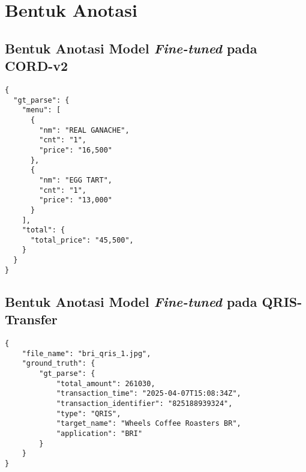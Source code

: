\chapter{Bentuk Anotasi}
\label{chap:bentuk-anotasi}

\section{Bentuk Anotasi Model \donut{} \emph{Fine-tuned} pada \datasetfl{} CORD-v2}
\begin{lstlisting}[style=jsonstyle]
{
  "gt_parse": {
    "menu": [
      {
        "nm": "REAL GANACHE",
        "cnt": "1",
        "price": "16,500"
      },
      {
        "nm": "EGG TART",
        "cnt": "1",
        "price": "13,000"
      }
    ],
    "total": {
      "total_price": "45,500",
    }
  }
}
\end{lstlisting}

\section{Bentuk Anotasi Model \donut{} \emph{Fine-tuned} pada \datasetfl{} QRIS-Transfer}
\begin{lstlisting}[style=jsonstyle]
{
    "file_name": "bri_qris_1.jpg",
    "ground_truth": {
        "gt_parse": {
            "total_amount": 261030,
            "transaction_time": "2025-04-07T15:08:34Z",
            "transaction_identifier": "825188939324",
            "type": "QRIS",
            "target_name": "Wheels Coffee Roasters BR",
            "application": "BRI"
        }
    }
}
\end{lstlisting}